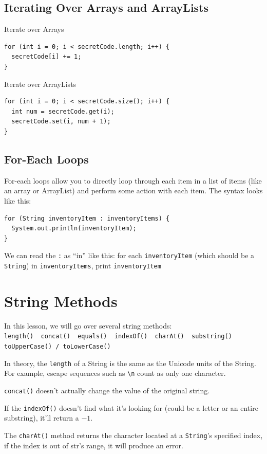 \documentclass[a4paper, 12pt]{article}
\begin{document}
\subsection{Iterating Over Arrays and ArrayLists}
Iterate over Arrays
\begin{verbatim}
for (int i = 0; i < secretCode.length; i++) {
  secretCode[i] += 1;
}
\end{verbatim}

Iterate over ArrayLists
\begin{verbatim}
for (int i = 0; i < secretCode.size(); i++) {
  int num = secretCode.get(i);
  secretCode.set(i, num + 1);
}
\end{verbatim}

\subsection{For-Each Loops}
For-each loops allow you to directly loop through each item in a list of items (like an array or ArrayList) and perform some action with each item. The syntax looks like this:
\begin{verbatim}
for (String inventoryItem : inventoryItems) {
  System.out.println(inventoryItem);
}
\end{verbatim}
We can read the \verb|:| as ``in'' like this: for each \verb|inventoryItem| (which should be a \verb|String|) in \verb|inventoryItems|, print \verb|inventoryItem|


\section{String Methods}
In this lesson, we will go over several string methods:\\
\verb|length()  concat()  equals()  indexOf()  charAt()  substring()|\\
\verb|toUpperCase() / toLowerCase()|

In theory, the \verb|length| of a String is the same as the Unicode units of the String. For example, escape sequences such as \verb|\n| count as only one character.

\verb|concat()| doesn't actually change the value of the original string.

If the \verb|indexOf()| doesn't find what it's looking for (could be a letter or an entire substring), it'll return a $-1$.

The \verb|charAt()| method returns the character located at a \verb|String|'s specified index, if the index is out of str's range, it will produce an error.
\end{document}
